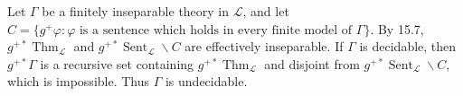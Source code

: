 Let $\Gamma$ be a finitely inseparable theory in $\mathcal{L}$, and let $C = \{ g^{+}\varphi : \varphi \text{ is a sentence which holds in every finite model of } \Gamma \}$. By 15.7, $g^{+*} \operatorname{Thm}_{\mathcal{L}}$ and $g^{+*} \operatorname{Sent}_{\mathcal{L}} \smallsetminus C$ are effectively inseparable. If $\Gamma$ is decidable, then $g^{+*} \Gamma$ is a recursive set containing $g^{+*} \operatorname{Thm}_{\mathcal{L}}$ and disjoint from $g^{+*} \operatorname{Sent}_{\mathcal{L}} \smallsetminus C$, which is impossible. Thus $\Gamma$ is undecidable.
